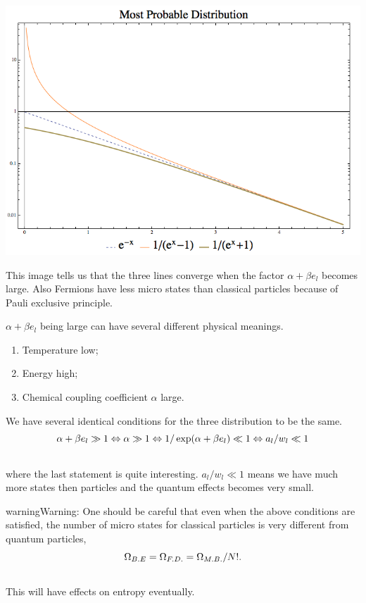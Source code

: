\documentclass[letterpaper,10pt,english]{sphinxmanual}
\begin{document}
{\hfill\includegraphics{mostProbableDistribution.png}\hfill}

This image tells us that the three lines converge when the factor $\alpha + \beta e_l$ becomes large. Also Fermions have less micro states than classical particles because of Pauli exclusive principle.

$\alpha + \beta e_l$ being large can have several different physical meanings.
\begin{enumerate}
\item {} 
Temperature low;

\item {} 
Energy high;

\item {} 
Chemical coupling coefficient $\alpha$ large.

\end{enumerate}

We have several identical conditions for the three distribution to be the same.
\begin{gather}
\begin{split}\alpha + \beta e_l \gg 1 \Leftrightarrow \alpha \gg 1 \Leftrightarrow 1/\exp(\alpha + \beta e_l) \ll 1 \Leftrightarrow a_l / w_l \ll 1\end{split}\notag\\\begin{split}\end{split}\notag
\end{gather}
where the last statement is quite interesting. $a_l/w_l \ll 1$ means we have much more states then particles and the quantum effects becomes very small.

\begin{notice}{warning}{Warning:}
One should be careful that even when the above conditions are satisfied, the number of micro states for classical particles is very different from quantum particles,
\begin{gather}
\begin{split}\Omega_{B.E} = \Omega_{F.D.} = \Omega_{M.B.}/N!  .\end{split}\notag\\\begin{split}\end{split}\notag
\end{gather}
This will have effects on entropy eventually.
\end{notice}
\end{document}
